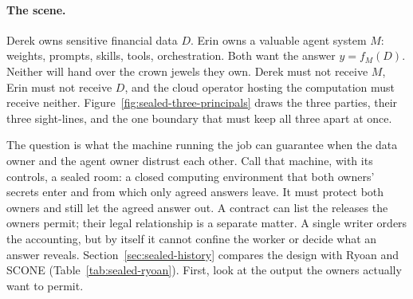 \documentclass[11pt,a4paper]{article}
\theoremstyle{definition}
\begin{document}
\paragraph{The scene.}
Derek owns sensitive financial data $D$. Erin owns a valuable agent system $M$:
weights, prompts, skills, tools, orchestration. Both want the answer
$y=f_M(D)$. Neither will hand over the crown jewels they own. Derek must not receive $M$,
Erin must not receive $D$, and the cloud operator hosting the computation must
receive neither. Figure~\ref{fig:sealed-three-principals} draws the three
parties, their three sight-lines, and the one boundary that must keep all
three apart at once.

The question is what the machine running the job can guarantee when the data
owner and the agent owner distrust each other. Call that machine, with its
controls, a sealed room: a closed computing environment that both owners'
secrets enter and from which only agreed answers leave. It must protect both
owners and still let the agreed answer out. A contract can list the releases
the owners permit; their legal relationship is a separate matter. A single
writer orders the accounting, but by itself it cannot confine the worker or
decide what an answer reveals. Section~\ref{sec:sealed-history} compares the
design with Ryoan and SCONE (Table~\ref{tab:sealed-ryoan}). First, look at the
output the owners actually want to permit.
\end{document}
